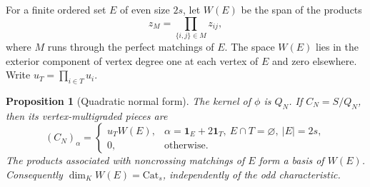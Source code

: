 \documentclass[11pt]{article}
\newtheorem{proposition}[theorem]{Proposition}
\theoremstyle{definition}
\theoremstyle{remark}
\numberwithin{equation}{section}
\newcommand{\kk}{K}
\newcommand{\Cat}{\mathrm{Cat}}
\newcommand{\one}{\mathbf{1}}
\begin{document}
For a finite ordered set $E$ of even size $2s$, let $W(E)$ be the span of
the products
\[
 z_M=\prod_{\{i,j\}\in M}z_{ij},
\]
where $M$ runs through the perfect matchings of $E$. The space $W(E)$
lies in the exterior component of vertex degree one at each vertex of
$E$ and zero elsewhere. Write $u_T=\prod_{i\in T}u_i$.

\begin{proposition}[Quadratic normal form]\label{prop:normal}
The kernel of $\phi$ is $Q_N$. If $C_N=S/Q_N$, then its vertex-multigraded
pieces are
\begin{equation}\label{eq:pieces}
 (C_N)_\alpha=
 \begin{cases}
  u_TW(E),&\alpha=\one_E+2\one_T,
       \ E\cap T=\varnothing,\ |E|=2s,\\
  0,&\text{otherwise}.
 \end{cases}
\end{equation}
The products associated with noncrossing matchings of $E$ form a basis
of $W(E)$. Consequently $\dim_\kk W(E)=\Cat_s$, independently of the
odd characteristic.
\end{proposition}
\end{document}
